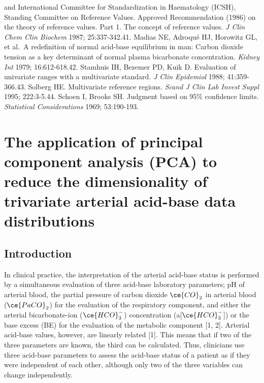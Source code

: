 \documentclass[
  12pt,
  a4paperpaper,
]{report}
\begin{document}
and International Committee for Standardization in Haematology (ICSH),
Standing Committee on Reference Values. Approved Recommendation (1986)
on the theory of reference values. Part 1. The concept of reference
values. \emph{J Clin Chem Clin Biochem} 1987; 25:337-342.41. Madias NE,
Adroqué HJ, Horowitz GL, et al.~A redefinition of normal acid-base
equilibrium in man: Carbon dioxide tension as a key determinant of
normal plasma bicarbonate concentration. \emph{Kidney Int} 1979;
16:612-618.42. Stamhuis IH, Bezemer PD, Kuik D. Evaluation of univariate
ranges with a multivariate standard. \emph{J Clin Epidemiol} 1988;
41:359-366.43. Solberg HE. Multivariate reference regions. \emph{Scand J
Clin Lab Invest Suppl} 1995; 222:3-5.44. Schoen I, Brooks SH. Judgment
based on 95\% confidence limits. \emph{Statistical Considerations} 1969;
53:190-193.

\hypertarget{the-application-of-principal-component-analysis-pca-to-reduce-the-dimensionality-of-trivariate-arterial-acid-base-data-distributions}{%
\chapter{The application of principal component analysis (PCA) to reduce
the dimensionality of trivariate arterial acid-base data
distributions}\label{the-application-of-principal-component-analysis-pca-to-reduce-the-dimensionality-of-trivariate-arterial-acid-base-data-distributions}}

\hypertarget{introduction}{%
\section{Introduction}\label{introduction}}

In clinical practice, the interpretation of the arterial acid-base
status is performed by a simultaneous evaluation of three acid-base
laboratory parameters; pH of arterial blood, the partial pressure of
carbon dioxide \(\ce{CO}_{2}\) in arterial blood (\(\ce{PaCO}_{2}\)) for
the evaluation of the respiratory component, and either the arterial
bicarbonate-ion (\(\ce{HCO}_{3}^{-}\)) concentration
(a{[}\(\ce{HCO}_{3}^{-}\){]}) or the base excess (BE) for the evaluation
of the metabolic component {[}1, 2{]}. Arterial acid-base values,
however, are linearly related {[}1{]}. This means that if two of the
three parameters are known, the third can be calculated. Thus,
clinicians use three acid-base parameters to assess the acid-base status
of a patient as if they were independent of each other, although only
two of the three variables can change independently.
\end{document}
